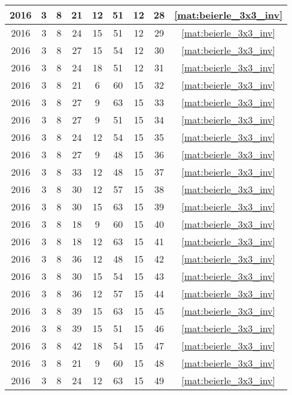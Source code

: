 \begin{longtable}{|c|c|c|c|c|c|c|c|c|}
2016 & 3 & 8 & 21 & 12 & 51 & 12 & 28 & \eqref{mat:beierle_3x3_inv} \\ \hline 
2016 & 3 & 8 & 24 & 15 & 51 & 12 & 29 & \eqref{mat:beierle_3x3_inv} \\ \hline 
2016 & 3 & 8 & 27 & 15 & 54 & 12 & 30 & \eqref{mat:beierle_3x3_inv} \\ \hline 
2016 & 3 & 8 & 24 & 18 & 51 & 12 & 31 & \eqref{mat:beierle_3x3_inv} \\ \hline 
2016 & 3 & 8 & 21 & 6 & 60 & 15 & 32 & \eqref{mat:beierle_3x3_inv} \\ \hline 
2016 & 3 & 8 & 27 & 9 & 63 & 15 & 33 & \eqref{mat:beierle_3x3_inv} \\ \hline 
2016 & 3 & 8 & 27 & 9 & 51 & 15 & 34 & \eqref{mat:beierle_3x3_inv} \\ \hline 
2016 & 3 & 8 & 24 & 12 & 54 & 15 & 35 & \eqref{mat:beierle_3x3_inv} \\ \hline 
2016 & 3 & 8 & 27 & 9 & 48 & 15 & 36 & \eqref{mat:beierle_3x3_inv} \\ \hline 
2016 & 3 & 8 & 33 & 12 & 48 & 15 & 37 & \eqref{mat:beierle_3x3_inv} \\ \hline 
2016 & 3 & 8 & 30 & 12 & 57 & 15 & 38 & \eqref{mat:beierle_3x3_inv} \\ \hline 
2016 & 3 & 8 & 30 & 15 & 63 & 15 & 39 & \eqref{mat:beierle_3x3_inv} \\ \hline 
2016 & 3 & 8 & 18 & 9 & 60 & 15 & 40 & \eqref{mat:beierle_3x3_inv} \\ \hline 
2016 & 3 & 8 & 18 & 12 & 63 & 15 & 41 & \eqref{mat:beierle_3x3_inv} \\ \hline 
2016 & 3 & 8 & 36 & 12 & 48 & 15 & 42 & \eqref{mat:beierle_3x3_inv} \\ \hline 
2016 & 3 & 8 & 30 & 15 & 54 & 15 & 43 & \eqref{mat:beierle_3x3_inv} \\ \hline 
2016 & 3 & 8 & 36 & 12 & 57 & 15 & 44 & \eqref{mat:beierle_3x3_inv} \\ \hline 
2016 & 3 & 8 & 39 & 15 & 63 & 15 & 45 & \eqref{mat:beierle_3x3_inv} \\ \hline 
2016 & 3 & 8 & 39 & 15 & 51 & 15 & 46 & \eqref{mat:beierle_3x3_inv} \\ \hline 
2016 & 3 & 8 & 42 & 18 & 54 & 15 & 47 & \eqref{mat:beierle_3x3_inv} \\ \hline 
2016 & 3 & 8 & 21 & 9 & 60 & 15 & 48 & \eqref{mat:beierle_3x3_inv} \\ \hline 
2016 & 3 & 8 & 24 & 12 & 63 & 15 & 49 & \eqref{mat:beierle_3x3_inv} \\ \hline 

\end{longtable}
